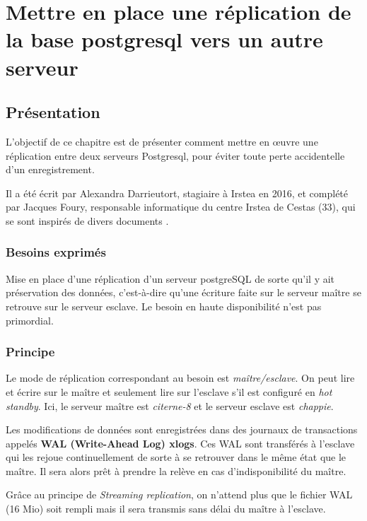 \chapter{Mettre en place une réplication de la base postgresql vers un autre serveur}

\section{Présentation}
L'objectif de ce chapitre est de présenter comment mettre en œuvre une réplication entre deux serveurs Postgresql, pour éviter toute perte accidentelle d'un enregistrement.

Il a été écrit par Alexandra Darrieutort, stagiaire à Irstea en 2016, et complété par Jacques Foury, responsable informatique du centre Irstea de Cestas (33), qui se sont inspirés de divers documents \cite{digitOcean} \cite{zeroPostgres} \cite{replicationPostgres} \cite{replicationTutorial}.

\subsection{Besoins exprimés}

Mise en place d'une réplication d'un serveur postgreSQL de sorte qu'il y ait préservation des données, c'est-à-dire qu'une écriture faite sur le serveur maître se retrouve sur le serveur esclave. Le besoin en haute disponibilité n'est pas primordial. 

\subsection{Principe}

Le mode de réplication correspondant au besoin est \textit{maître/esclave}. On peut lire et écrire sur le maître et seulement lire sur l'esclave s'il est configuré en \textit{hot standby}. Ici, le serveur maître est \textit{citerne-8} et le serveur esclave est \textit{chappie}.

Les modifications de données sont enregistrées dans des journaux de transactions appelés \textbf{WAL (Write-Ahead Log) xlogs}. Ces WAL sont transférés à l'esclave qui les rejoue continuellement de sorte à se retrouver dans le même état que le maître. Il sera alors prêt à prendre la relève en cas d'indisponibilité du maître.

Grâce au principe de \textit{Streaming replication}, on n'attend plus que le fichier WAL (16 Mio) soit rempli mais il sera transmis sans délai du maître à l'esclave.

